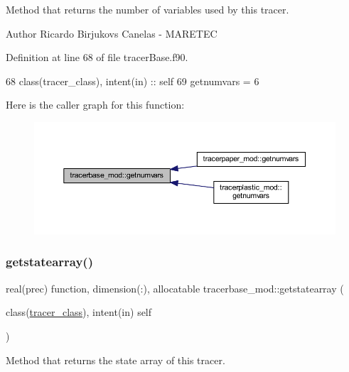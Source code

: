 Method that returns the number of variables used by this tracer. 

\begin{DoxyAuthor}{Author}
Ricardo Birjukovs Canelas -\/ M\+A\+R\+E\+T\+EC 
\end{DoxyAuthor}


Definition at line 68 of file tracer\+Base.\+f90.


\begin{DoxyCode}
68     \textcolor{keywordtype}{class}(tracer\_class), \textcolor{keywordtype}{intent(in)} :: self
69     getnumvars = 6
\end{DoxyCode}
Here is the caller graph for this function\+:\nopagebreak
\begin{figure}[H]
\begin{center}
\leavevmode
\includegraphics[width=350pt]{namespacetracerbase__mod_a0be55b393be0846cbbe6be9feb3bb539_icgraph}
\end{center}
\end{figure}
\mbox{\label{namespacetracerbase__mod_adbdd85bd57f1a9debbe7b682099afb1d}} 
\subsubsection{\texorpdfstring{getstatearray()}{getstatearray()}}
{\footnotesize\ttfamily real(prec) function, dimension(\+:), allocatable tracerbase\+\_\+mod\+::getstatearray (\begin{DoxyParamCaption}\item[{class(\mbox{\hyperlink{structtracerbase__mod_1_1tracer__class}{tracer\+\_\+class}}), intent(in)}]{self }\end{DoxyParamCaption})\hspace{0.3cm}{\ttfamily [private]}}



Method that returns the state array of this tracer. 

